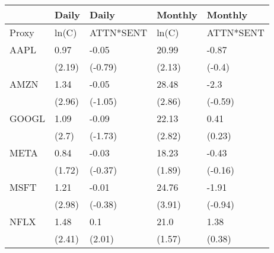 \begin{tabular}{lllll}
\toprule
{} &   Daily &      Daily & Monthly &    Monthly \\
\midrule
Proxy &   ln(C) &  ATTN*SENT &   ln(C) &  ATTN*SENT \\
AAPL  &    0.97 &      -0.05 &   20.99 &      -0.87 \\
      &  (2.19) &    (-0.79) &  (2.13) &     (-0.4) \\
AMZN  &    1.34 &      -0.05 &   28.48 &       -2.3 \\
      &  (2.96) &    (-1.05) &  (2.86) &    (-0.59) \\
GOOGL &    1.09 &      -0.09 &   22.13 &       0.41 \\
      &   (2.7) &    (-1.73) &  (2.82) &     (0.23) \\
META  &    0.84 &      -0.03 &   18.23 &      -0.43 \\
      &  (1.72) &    (-0.37) &  (1.89) &    (-0.16) \\
MSFT  &    1.21 &      -0.01 &   24.76 &      -1.91 \\
      &  (2.98) &    (-0.38) &  (3.91) &    (-0.94) \\
NFLX  &    1.48 &        0.1 &    21.0 &       1.38 \\
      &  (2.41) &     (2.01) &  (1.57) &     (0.38) \\
\bottomrule
\end{tabular}
